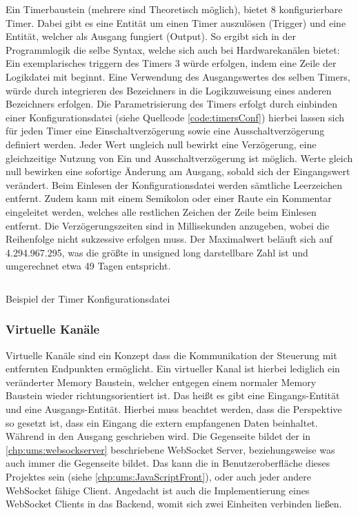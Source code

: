Ein Timerbaustein (mehrere sind Theoretisch möglich), bietet 8 konfigurierbare Timer. Dabei gibt es eine Entität um einen Timer auszulösen  (Trigger) und eine Entität, welcher als Ausgang fungiert  (Output). So ergibt sich in der Programmlogik die selbe Syntax, welche sich auch bei Hardwarekanälen bietet: Ein exemplarisches triggern des Timers 3 würde erfolgen, indem eine Zeile der Logikdatei mit \chphl{[Tt3=]} beginnt. Eine Verwendung des Ausgangswertes des selben Timers, würde durch integrieren des Bezeichners \chphl{[To3]} in die Logikzuweisung eines anderen Bezeichners erfolgen. Die Parametrisierung des Timers erfolgt durch einbinden einer Konfigurationsdatei (siehe Quellcode \ref{code:timersConf}) hierbei lassen sich für jeden Timer eine Einschaltverzögerung sowie eine Ausschaltverzögerung definiert werden. Jeder Wert ungleich null bewirkt eine Verzögerung, eine gleichzeitige Nutzung von Ein und Ausschaltverzögerung ist möglich. Werte gleich null bewirken eine sofortige Änderung am Ausgang, sobald sich der Eingangswert verändert. Beim Einlesen der Konfigurationsdatei werden sämtliche Leerzeichen entfernt. Zudem kann mit einem Semikolon \chphl{;} oder einer Raute \chphl{\#} ein Kommentar eingeleitet werden, welches alle restlichen Zeichen der Zeile beim Einlesen entfernt. Die Verzögerungszeiten sind in Millisekunden anzugeben, wobei die Reihenfolge nicht sukzessive erfolgen muss. Der Maximalwert beläuft sich auf 4.294.967.295, was die größte in unsigned long darstellbare Zahl ist und umgerechnet etwa 49 Tagen entspricht. 
\begin{listing}[H]
	\inputminted[numbersep=1pt,fontsize=\scriptsize,frame=single, firstline=14,lastline=25]{c}{./code/timers.conf}
	\caption{Beispiel der Timer Konfigurationsdatei}
	\label{code:timersConf}
\end{listing}


\subsubsection{Virtuelle Kanäle}\label{kap:ums:virtualchannel}
Virtuelle Kanäle sind ein Konzept dass die Kommunikation der Steuerung mit entfernten Endpunkten ermöglicht. Ein virtueller Kanal ist hierbei lediglich ein veränderter Memory Baustein, welcher entgegen einem normaler Memory Baustein wieder richtungsorientiert ist. Das heißt es gibt eine Eingangs-Entität und eine Ausgangs-Entität. Hierbei muss beachtet werden, dass die Perspektive so gesetzt ist, dass ein Eingang die extern empfangenen Daten beinhaltet. Während in den Ausgang geschrieben wird. Die Gegenseite bildet der in \autoref{chp:ums:websockserver} beschriebene WebSocket Server, beziehungsweise was auch immer die Gegenseite bildet. Das kann die in Benutzeroberfläche dieses Projektes sein (siehe \autoref{chp:ums:JavaScriptFront}), oder auch jeder andere WebSocket fähige Client. Angedacht ist auch die Implementierung eines WebSocket Clients in das Backend, womit sich zwei Einheiten verbinden ließen. 


